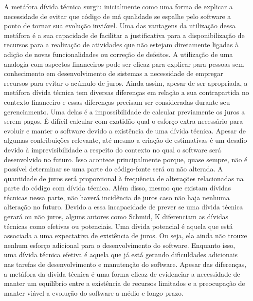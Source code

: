 A metáfora dívida técnica surgiu inicialmente como uma forma de explicar a necessidade de evitar que código de má qualidade se espalhe pelo software a ponto de tornar sua evolução inviável\cite{cunningham1993wycash}. Uma das vantagens da utilização dessa metáfora é a sua capacidade de facilitar a justificativa para a disponibilização de recursos para a realização de atividades que não estejam diretamente ligadas à adição de novas funcionalidades ou correção de defeitos.  A utilização de uma analogia com aspectos financeiros pode ser eficaz para explicar para pessoas sem conhecimento em desenvolvimento de sistemas a necessidade de empregar recursos para evitar o acúmulo de juros. Ainda assim,  apesar de ser apropriada, a metáfora dívida técnica tem diversas diferenças em relação a sua contrapartida no contexto financeiro e essas diferenças precisam ser consideradas durante seu gerenciamento. Uma delas é a impossibilidade de calcular previamente os juros a serem pagos. É difícil calcular com exatidão qual o esforço extra necessário para evoluir e manter o software devido a existência de uma dívida técnica. Apesar de algumas contribuições relevante\cite{singh2014framework,seaman2011measuring,curtis2012estimating}, até mesmo a criação de estimativas é um desafio devido à imprevisibilidade a respeito do contexto no qual o software será desenvolvido no futuro. Isso acontece principalmente porque, quase sempre, não é possível determinar se uma parte do código-fonte será ou não alterada. A quantidade de juros será proporcional à frequência de alterações relacionadas na parte do código com dívida técnica. Além disso, mesmo que existam dívidas técnicas nessa parte, não haverá incidência de juros caso não haja nenhuma alteração no futuro. Devido a essa incapacidade de prever se uma dívida técnica gerará ou não juros, alguns autores como Schmid, K\cite{schmid2013limits} diferenciam as dívidas técnicas como efetivas ou potenciais. Uma dívida potencial é aquela que está associada a uma expectativa de  existência de juros. Ou seja, ela ainda não trouxe nenhum esforço adicional para o desenvolvimento do software. Enquanto isso, uma dívida técnica efetiva é aquela que já está gerando dificuldades adicionais nas tarefas de desenvolvimento e manutenção do software. Apesar das diferenças, a metáfora da dívida técnica é uma forma eficaz de evidenciar a necessidade de manter um equilíbrio entre a existência de recursos limitados e a preocupação de manter viável a evolução do software a médio e longo prazo.



